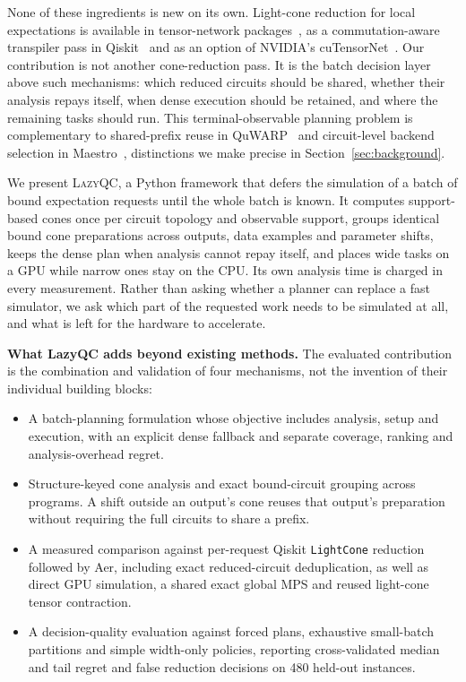 None of these ingredients is new on its own. Light-cone reduction for local expectations is available in tensor-network packages~\cite{gray2018quimb}, as a commutation-aware transpiler pass in Qiskit~\cite{qiskitlightcone} and as an option of NVIDIA's cuTensorNet~\cite{cutensornetlightcone}. Our contribution is not another cone-reduction pass. It is the batch decision layer above such mechanisms: which reduced circuits should be shared, whether their analysis repays itself, when dense execution should be retained, and where the remaining tasks should run. This terminal-observable planning problem is complementary to shared-prefix reuse in QuWARP~\cite{littau2026quwarp} and circuit-level backend selection in Maestro~\cite{bertomeu2025maestro}, distinctions we make precise in Section~\ref{sec:background}.

We present \textsc{LazyQC}, a Python framework that defers the simulation of a batch of bound expectation requests until the whole batch is known. It computes support-based cones once per circuit topology and observable support, groups identical bound cone preparations across outputs, data examples and parameter shifts, keeps the dense plan when analysis cannot repay itself, and places wide tasks on a GPU while narrow ones stay on the CPU. Its own analysis time is charged in every measurement. Rather than asking whether a planner can replace a fast simulator, we ask which part of the requested work needs to be simulated at all, and what is left for the hardware to accelerate.

\textbf{What LazyQC adds beyond existing methods.} The evaluated contribution is the combination and validation of four mechanisms, not the invention of their individual building blocks:
\begin{itemize}
\item A batch-planning formulation whose objective includes analysis, setup and execution, with an explicit dense fallback and separate coverage, ranking and analysis-overhead regret.
\item Structure-keyed cone analysis and exact bound-circuit grouping across programs. A shift outside an output's cone reuses that output's preparation without requiring the full circuits to share a prefix.
\item A measured comparison against per-request Qiskit \texttt{LightCone} reduction followed by Aer, including exact reduced-circuit deduplication, as well as direct GPU simulation, a shared exact global MPS and reused light-cone tensor contraction.
\item A decision-quality evaluation against forced plans, exhaustive small-batch partitions and simple width-only policies, reporting cross-validated median and tail regret and false reduction decisions on 480 held-out instances.
\end{itemize}


